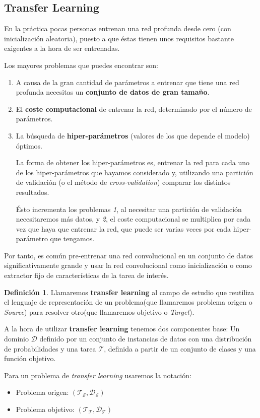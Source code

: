 \documentclass[12,twoside]{TFG-GM}
\theoremstyle{definition}
\newtheorem{definition}[theorem]{Definición}
\theoremstyle{remark}
\begin{document}
\newpage
\subsection{Transfer Learning}

En la práctica pocas personas entrenan una red profunda desde cero (con inicialización aleatoria), puesto a que éstas tienen unos requisitos bastante exigentes a la hora de ser entrenadas. 

Los mayores problemas que puedes encontrar son: 
\begin{enumerate}
\item A causa de la gran cantidad de parámetros a entrenar que tiene una red profunda necesitas un \textbf{conjunto de datos de gran tamaño}.
\item El \textbf{coste computacional} de entrenar la red, determinado por el número de parámetros. 
\item La búsqueda de \textbf{hiper-parámetros} (valores de los que depende el modelo) óptimos. 

La forma de obtener los hiper-parámetros es, entrenar la red para cada uno de los hiper-parámetros que hayamos considerado y, utilizando una partición de validación (o el método de \textit{cross-validation}) comparar los distintos resultados.  

Ésto incrementa los problemas \textit{1}, al necesitar una partición de validación necesitaremos más datos, y \textit{2}, el coste computacional se multiplica por cada vez que haya que entrenar la red, que puede ser varias veces por cada hiper-parámetro que tengamos.
\end{enumerate}
Por tanto, es común pre-entrenar una red convolucional en un conjunto de datos significativamente grande y usar la red convolucional como inicialización o como extractor fijo de características de la tarea de interés. 
\begin{definition}
Llamaremos \textbf{transfer learning} al campo de estudio que reutiliza el lenguaje de representación de un problema(que llamaremos problema origen o \textit{Source}) para resolver otro(que llamaremos objetivo o \textit{Target}). 

A la hora de utilizar \textbf{transfer learning} tenemos dos componentes base:  Un dominio $\mathcal{D}$ definido por un conjunto de instancias de datos con una distribución de probabilidades y una tarea $\mathcal{T}$, definida a partir de un conjunto de clases y una función objetivo.

Para un problema de \textit{transfer learning} usaremos la notación: 
\begin{itemize}
\item Problema origen: $(\mathcal{T_S},\mathcal{D_S})$
\item Problema objetivo: $(\mathcal{T_T},\mathcal{D_T})$
\end{itemize}

\end{definition}
\end{document}
